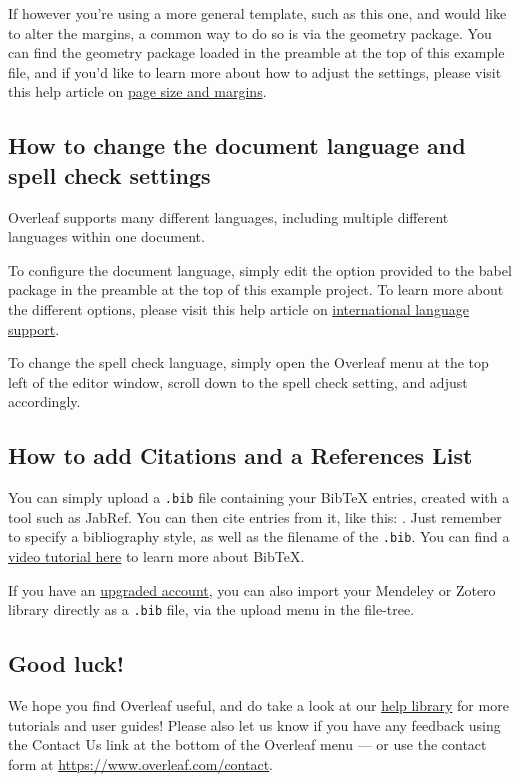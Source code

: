 \documentclass{article}
\begin{document}
	If however you're using a more general template, such as this one, and would like to alter the margins, a common way to do so is via the geometry package. You can find the geometry package loaded in the preamble at the top of this example file, and if you'd like to learn more about how to adjust the settings, please visit this help article on \href{https://www.overleaf.com/learn/latex/page_size_and_margins}{page size and margins}.
	
	\subsection{How to change the document language and spell check settings}
	
	Overleaf supports many different languages, including multiple different languages within one document. 
	
	To configure the document language, simply edit the option provided to the babel package in the preamble at the top of this example project. To learn more about the different options, please visit this help article on \href{https://www.overleaf.com/learn/latex/International_language_support}{international language support}.
	
	To change the spell check language, simply open the Overleaf menu at the top left of the editor window, scroll down to the spell check setting, and adjust accordingly.
	
	\subsection{How to add Citations and a References List}
	
	You can simply upload a \verb|.bib| file containing your BibTeX entries, created with a tool such as JabRef. You can then cite entries from it, like this: \cite{greenwade93}. Just remember to specify a bibliography style, as well as the filename of the \verb|.bib|. You can find a \href{https://www.overleaf.com/help/97-how-to-include-a-bibliography-using-bibtex}{video tutorial here} to learn more about BibTeX.
	
	If you have an \href{https://www.overleaf.com/user/subscription/plans}{upgraded account}, you can also import your Mendeley or Zotero library directly as a \verb|.bib| file, via the upload menu in the file-tree.
	
	\subsection{Good luck!}
	
	We hope you find Overleaf useful, and do take a look at our \href{https://www.overleaf.com/learn}{help library} for more tutorials and user guides! Please also let us know if you have any feedback using the Contact Us link at the bottom of the Overleaf menu --- or use the contact form at \url{https://www.overleaf.com/contact}.
	
	
	
	
\end{document}
